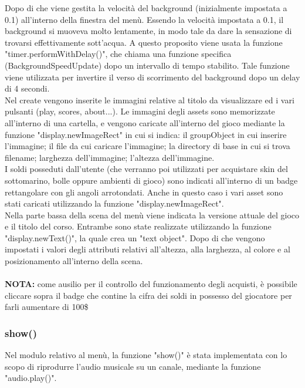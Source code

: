 \documentclass[12pt]{article}
\begin{document}
Dopo di che viene gestita la velocità del background (inizialmente impostata a 0.1) all'interno della finestra del menù. Essendo la velocità impostata a 0.1, il background si muoveva molto lentamente, in modo tale da dare la sensazione di trovarsi effettivamente sott'acqua. A questo proposito viene usata la funzione "timer.performWithDelay()", che chiama una funzione specifica (BackgroundSpeedUpdate) dopo un intervallo di tempo stabilito. Tale funzione viene utilizzata per invertire il verso di scorrimento del background dopo un delay di 4 secondi. 
\\

Nel create vengono inserite le immagini relative al titolo da visualizzare ed i vari pulsanti (play, scores, about...). Le immagini degli assets sono memorizzate all'interno di una cartella, e vengono caricate all'interno del gioco mediante la funzione "display.newImageRect" in cui si indica: il groupObject in cui inserire l'immagine; il file da cui caricare l'immagine; la directory di base in cui si trova filename; larghezza dell'immagine; l'altezza dell'immagine. 
\\

I soldi posseduti dall'utente (che verranno poi utilizzati per acquistare skin del sottomarino, bolle oppure ambienti di gioco) sono indicati all'interno di un badge rettangolare con gli angoli arrotondati. Anche in questo caso i vari asset sono stati caricati utilizzando la funzione "display.newImageRect". 
\\

Nella parte bassa della scena del menù viene indicata la versione attuale del gioco e il titolo del corso. Entrambe sono state realizzate utilizzando la funzione "display.newText()", la quale crea un "text object". Dopo di che vengono impostati i valori degli attributi relativi all'altezza, alla larghezza, al colore e al posizionamento all'interno della scena. 
\\
\\
\textbf{NOTA:} come ausilio per il controllo del funzionamento degli acquisti, è possibile cliccare sopra il badge che contine la cifra dei soldi in possesso del giocatore per farli aumentare di 100\$ 

\subsubsection{show()}
Nel modulo relativo al menù, la funzione "show()" è stata implementata con lo scopo di riprodurre l'audio musicale su un canale, mediante la funzione "audio.play()".
\end{document}
